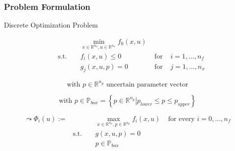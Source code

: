 

\begin{frame}
\frametitle{Problem Formulation}

\begin{block}{Discrete Optimization Problem}
	
\begin{align*}
 &&& \min_{x\in \mathbb{R}^{n_{x}}, u\in \mathbb{R}^{n_{u}}}  f_{0}(x, u)\\
& \text{ s.t. } &&  f_{i}(x,u) \leq 0 & \text{ for } & i=1,\ldots,n_{f}\\
&&&  g_{j}(x,u,p)=0 & \text{ for } & j=1,\ldots,n_{x}
\end{align*}
\begin{overprint}
\begin{equation*}
\text{with } p\in \mathbb{R}^{n_{p}} \text{ uncertain parameter vector}
\end{equation*}

\begin{equation*}
\text{with } p\in\mathbb{P}_{box}=\left\{\left. p\in\mathbb{R}^{n_{p}} \right| p_{lower}\leq p \leq p_{upper}\right\}
\end{equation*}
\end{overprint}
\end{block}


\begin{align*}
 \leadsto \Phi_{i}(u):= &&& \max_{x\in \mathbb{R}^{n_{x}}, p\in \mathbb{R}^{n_{p}}} f_{i}(x,u)& \text{ for every } i=0,...,n_{f}\\
& \text{s.t. } && g(x,u,p)=0\\
&&& p\in\mathbb{P}_{box}
\end{align*}

\end{frame}

